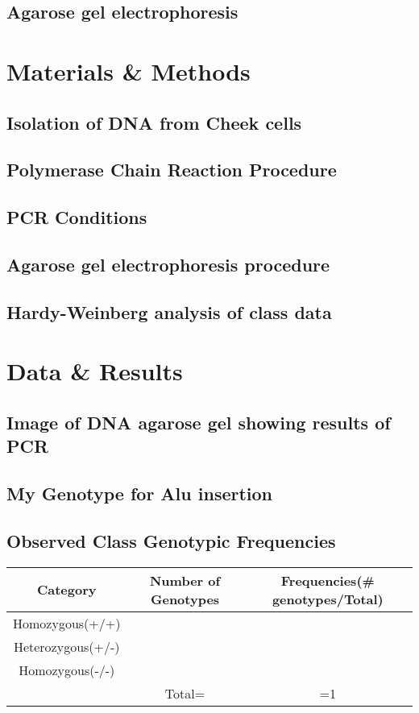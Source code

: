 \documentclass[paper=a4, fontsize=11pt]{scrartcl} %
\numberwithin{equation}{section} %
\numberwithin{figure}{section} %
\numberwithin{table}{section} %
\begin{document}
\subsection{Agarose gel electrophoresis}


\section{Materials \& Methods}

\subsection{Isolation of DNA from Cheek cells}
\subsection{Polymerase Chain Reaction Procedure}
\subsection{PCR Conditions}
\subsection{Agarose gel electrophoresis procedure}
\subsection{Hardy-Weinberg analysis of class data}





\section{Data \& Results}

\subsection{Image of DNA agarose gel showing results of PCR}
\subsection{My Genotype for Alu insertion}
\subsection{Observed Class Genotypic Frequencies}
\newpage
\begin{tabular}{|c|c|c|}
	
	\hline Category  & Number of Genotypes & Frequencies(\# genotypes/Total)  \\ 
	\hline  Homozygous(+/+)&  &  \\ 
	\hline  Heterozygous(+/-)&  &  \\ 
	\hline  Homozygous(-/-)&  &  \\ 
	\hline  & Total= & =1  \\ 
	\hline 
\end{tabular} 
\end{document}
